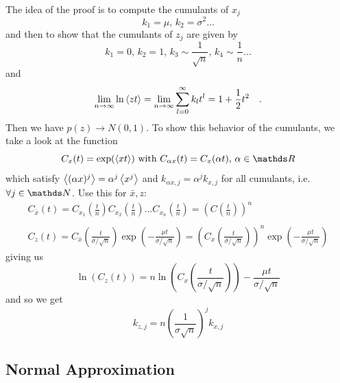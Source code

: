 \documentclass{notebook}
\begin{document}
The idea of the proof is to compute the cumulants of $x_j$
\begin{equation}
k_1 = \mu, \, k_2 = \sigma^2 \dots
\end{equation}
and then to show that the cumulants of $z_j$ are given by
\begin{equation}
k_1 = 0, \, k_2 = 1, \, k_3 \sim \frac{1}{\sqrt{n}}, \, k_4 \sim \frac{1}{n} \dots
\end{equation}
and
\begin{equation}
\lim_{n \to \infty} \ln \expval{zt} 
= \lim_{n \to \infty} \sum_{l=0}^{\infty} k_l t^l = 1 + \frac{1}{2} t^2 \quad.
\end{equation}
Then we have $p(z) \to N(0,1)$. 
To show this behavior of the cumulants, we take a look at the function
\begin{equation}
C_x(t) = \exp(\expval{xt}) \text{ with } C_{\alpha x}(t) = C_x(\alpha t), \, \alpha \in \R
\end{equation}
%
which satisfy $\expval{(\alpha x)^j} = \alpha^j \expval{x^j}$ and $k_{\alpha x, j} = \alpha^j k_{x,j}$ for all cumulants, i.e. $\forall j \in \N$. Use this for $\bar{x}, z$:
%
\begin{gather*}
	C_{\bar{x}}(t) = C_{x_1}\left( \frac{t}{n} \right) C_{x_2}\left( \frac{t}{n} \right) \dots C_{x_n}\left( \frac{t}{n} \right) = \left(C\left( \frac{t}{n} \right) \right)^n  \\ \\
	C_z(t) = C_{\bar{x}} \left( \frac{t}{\sigma/\sqrt{n}} \right) \exp(-\frac{\mu t}{\sigma/\sqrt{n}}) = \left( C_x \left( \frac{t}{\sigma/\sqrt{n}} \right) \right)^n  \exp(-\frac{\mu t}{\sigma/\sqrt{n}})
\end{gather*}
%
giving us
%
\begin{equation}
\ln(C_z(t)) = n \ln(C_x \left( \frac{t}{\sigma/\sqrt{n}} \right)) - \frac{\mu t}{\sigma/\sqrt{n}}
\end{equation}
%
and so we get
%
\begin{equation}
k_{z,j} = n \left( \frac{1}{\sigma \sqrt{n}} \right)^j k_{x,j}
\end{equation}
%

\subsection{Normal Approximation}
\end{document}
